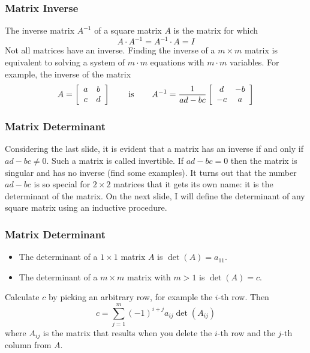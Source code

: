 \documentclass[xcolor=dvipsnames]{beamer}
\begin{document}
\begin{frame}
  \frametitle{Matrix Inverse}
The \alert{inverse matrix} $A^{-1}$ of a square matrix $A$ is the
matrix for which
\begin{equation}
  \label{eq:quoovain}
  A\cdot{}A^{-1}=A^{-1}\cdot{}A=I
\end{equation}
Not all matrices have an inverse. Finding the inverse of a
$m\times{}m$ matrix is equivalent to solving a system of $m\cdot{}m$
equations with $m\cdot{}m$ variables. For example, the inverse of the
matrix
\begin{equation}
  \label{eq:iiphiese}
  A=\left[
    \begin{array}{cc}
      a & b \\
      c & d
    \end{array}\right]\hspace{.25in}\mbox{ is }\hspace{.25in}A^{-1}=\frac{1}{ad-bc}\left[
    \begin{array}{cc}
      d & -b \\
      -c & a
    \end{array}\right]
\end{equation}
\end{frame}

\begin{frame}
  \frametitle{Matrix Determinant}
  Considering the last slide, it is evident that a matrix has an
  inverse if and only if $ad-bc\neq{}0$. Such a matrix is called
  \alert{invertible}. If $ad-bc=0$ then the matrix is \alert{singular}
  and has no inverse (find some examples). It turns out that the
  number $ad-bc$ is so special for $2\times{}2$ matrices that it gets
  its own name: it is the \alert{determinant} of the matrix. On the
  next slide, I will define the determinant of any square matrix using
  an inductive procedure.
\end{frame}

\begin{frame}
  \frametitle{Matrix Determinant}
  \begin{itemize}
  \item The determinant of a $1\times{}1$ matrix $A$ is
    $\det(A)=a_{11}$.
  \item The determinant of a $m\times{}m$ matrix with $m>1$ is
    $\det(A)=c$. 
  \end{itemize}
  Calculate $c$ by picking an arbitrary row, for example the $i$-th
  row. Then
  \begin{equation}
    \label{eq:queiyesh}
    c=\sum_{j=1}^{m}(-1)^{i+j}a_{ij}\det(A_{ij})
  \end{equation}
where $A_{ij}$ is the matrix that results when you delete the $i$-th
row and the $j$-th column from $A$.
\end{frame}
\end{document}
